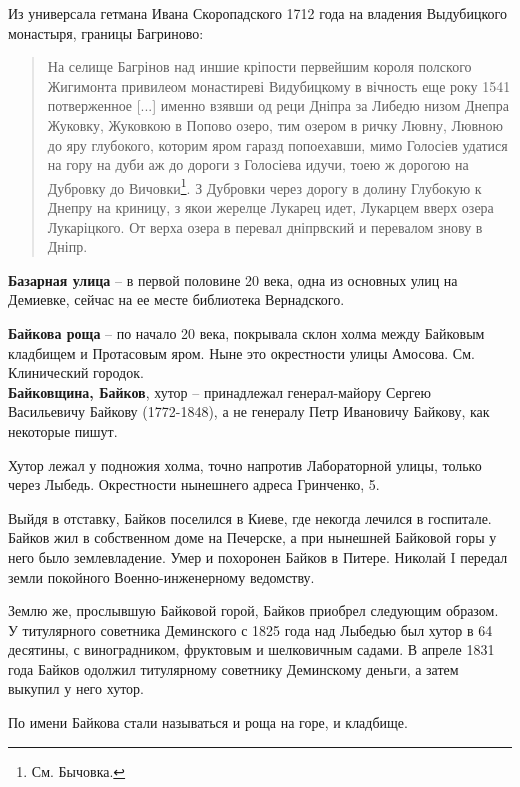Из универсала гетмана Ивана Скоропадского 1712 года на владения Выдубицкого монастыря, границы Багриново:

\begin{quotation}
На селище Багрінов над иншие кріпости первейшим короля полского Жигимонта привилеом монастиреві Видубицкому в вічность еще року 1541 потверженное [...] именно взявши од реци Дніпра за Либедю низом Днепра Жуковку, Жуковкою в Попово озеро, тим озером в ричку Лювну, Лювною до яру глубокого, которим яром гаразд попоехавши, мимо Голосіев удатися на гору на дуби аж до дороги з Голосіева идучи, тоею ж дорогою на Дубровку до Вичовки\footnote{См. Бычовка.}. З Дубровки через дорогу в долину Глубокую к Днепру на криницу, з якои жерелце Лукарец идет, Лукарцем вверх озера Лукаріцкого. От верха озера в перевал дніпрвский и перевалом знову в Дніпр.\end{quotation}

\medskip

\textbf{Базарная улица} – в первой половине 20 века, одна из основных улиц на Демиевке, сейчас на ее месте библиотека Вернадского.\\

\medskip


\textbf{Байкова роща} – по начало 20 века, покрывала склон холма между Байковым кладбищем и Протасовым яром. Ныне это окрестности улицы Амосова. См. Клинический городок.\\

\textbf{Байковщина, Байков}, хутор – принадлежал генерал-майору Сергею Васильевичу Байкову (1772-1848), а не генералу Петр Ивановичу Байкову, как некоторые пишут.

Хутор лежал у подножия холма, точно напротив Лабораторной улицы, только через Лыбедь. Окрестности нынешнего адреса Гринченко, 5.

Выйдя в отставку, Байков поселился в Киеве, где некогда лечился в госпитале. Байков жил в собственном доме на Печерске, а при нынешней Байковой горы у него было землевладение. Умер и похоронен Байков в Питере. Николай I передал земли покойного Военно-инженерному ведомству.

Землю же, прослывшую Байковой горой, Байков приобрел следующим образом. У титулярного советника Деминского с 1825 года над Лыбедью был хутор в 64 десятины, с виноградником, фруктовым и шелковичным садами. В апреле 1831 года Байков одолжил титулярному советнику Деминскому деньги, а затем выкупил у него хутор.

По имени Байкова стали называться и роща на горе, и кладбище.

